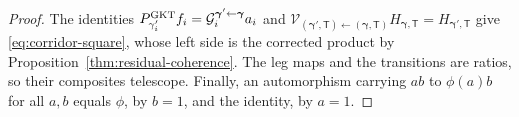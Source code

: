 \begin{proof}
The identities
$P^{\mathrm{GKT}}_{\gamma'_i}f_i=\mathcal G_i^{\boldsymbol\gamma'\leftarrow\boldsymbol\gamma}a_i$
and $\mathcal V_{(\boldsymbol\gamma',\mathsf T)\leftarrow(\boldsymbol\gamma,\mathsf T)}
H_{\boldsymbol\gamma,\mathsf T}=H_{\boldsymbol\gamma',\mathsf T}$ give
\eqref{eq:corridor-square}, whose left side is the corrected product by
Proposition~\ref{thm:residual-coherence}.  The leg maps and the transitions
are ratios, so their composites telescope.  Finally, an automorphism carrying
$ab$ to $\phi(a)b$ for all $a,b$ equals $\phi$, by $b=1$, and the identity,
by $a=1$.
\end{proof}
